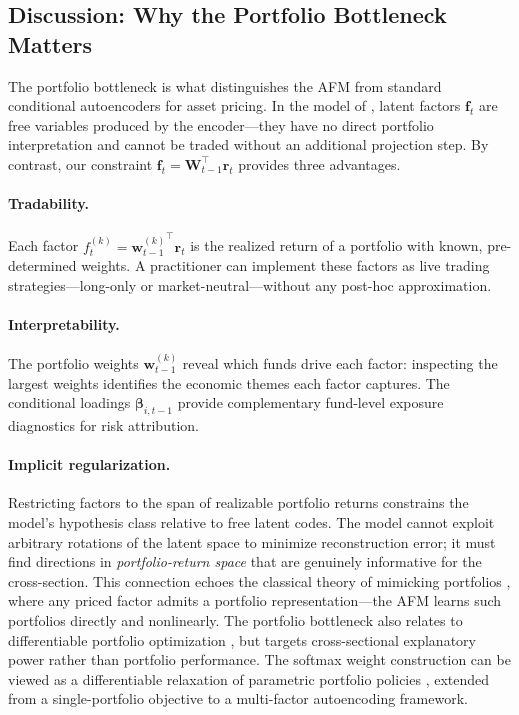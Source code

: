 \subsection{Discussion: Why the Portfolio Bottleneck Matters}\label{sec:discussion}

The portfolio bottleneck is what distinguishes the AFM from standard conditional autoencoders for asset pricing. In the model of \citet{GuKellyXiu2021autoencoder}, latent factors $\mathbf{f}_t$ are free variables produced by the encoder---they have no direct portfolio interpretation and cannot be traded without an additional projection step. By contrast, our constraint $\mathbf{f}_t = \mathbf{W}_{t-1}^\top \mathbf{r}_t$ provides three advantages.

\paragraph{Tradability.} Each factor $f_t^{(k)} = {\mathbf{w}_{t-1}^{(k)}}^\top \mathbf{r}_t$ is the realized return of a portfolio with known, pre-determined weights. A practitioner can implement these factors as live trading strategies---long-only or market-neutral---without any post-hoc approximation.

\paragraph{Interpretability.} The portfolio weights $\mathbf{w}_{t-1}^{(k)}$ reveal which funds drive each factor: inspecting the largest weights identifies the economic themes each factor captures. The conditional loadings $\boldsymbol{\beta}_{i,t-1}$ provide complementary fund-level exposure diagnostics for risk attribution.

\paragraph{Implicit regularization.} Restricting factors to the span of realizable portfolio returns constrains the model's hypothesis class relative to free latent codes. The model cannot exploit arbitrary rotations of the latent space to minimize reconstruction error; it must find directions in \emph{portfolio-return space} that are genuinely informative for the cross-section. This connection echoes the classical theory of mimicking portfolios \citep{Huberman1987mimicking}, where any priced factor admits a portfolio representation---the AFM learns such portfolios directly and nonlinearly. The portfolio bottleneck also relates to differentiable portfolio optimization \citep{Donti2017taskbased, Agrawal2019differentiable}, but targets cross-sectional explanatory power rather than portfolio performance. The softmax weight construction can be viewed as a differentiable relaxation of parametric portfolio policies \citep{Brandt2009parametric}, extended from a single-portfolio objective to a multi-factor autoencoding framework.
